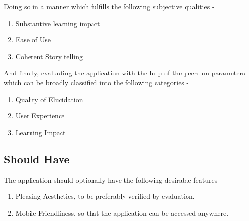 Doing so in a manner which fulfills the following subjective qualities -

\begin{enumerate}
\item Substantive learning impact
\item Ease of Use
\item Coherent Story telling
\end{enumerate}

And finally, evaluating the application with the help of the peers on
parameters which can be broadly classified into the following categories -

\begin{enumerate}
\item Quality of Elucidation
\item User Experience 
\item Learning Impact
\end{enumerate}

\subsection{Should Have}
The application should optionally have the following desirable features:
\begin{enumerate}
\item Pleasing Aesthetics, to be preferably verified by evaluation.
\item Mobile Friendliness, so that the application can be accessed anywhere.
\end{enumerate}

